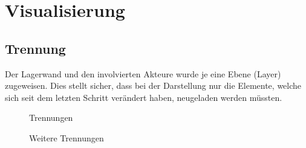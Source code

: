 \section{Visualisierung}

\subsection{Trennung}
Der Lagerwand und den involvierten Akteure wurde je eine Ebene (Layer) zugeweisen. Dies stellt sicher, dass bei der Darstellung nur die Elemente, welche sich seit dem letzten Schritt verändert haben, neugeladen werden müssten.  

%
\begin{figure}
\hfill
{}\hfill
{}
\caption{Trennungen}
\end{figure}

\begin{figure}
\hfill
{}
\caption{Weitere Trennungen}
\end{figure}


